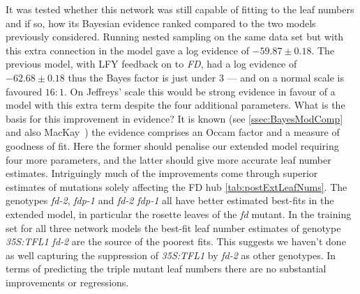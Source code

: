 It was tested whether this network was still capable of fitting to the leaf numbers and if so, how its Bayesian evidence ranked compared to the two models previously considered.
Running nested sampling on the same data set but with this extra connection in the model gave a log evidence of $-59.87\pm 0.18$.
The previous model, with LFY feedback on to \emph{FD}, had a log evidence of $-62.68\pm 0.18$ thus the Bayes factor is just under $3$ --- and on a normal scale is favoured $16:1$.
On Jeffreys' scale this would be strong evidence in favour of a model with this extra term despite the four additional parameters.
What is the basis for this improvement in evidence?
It is known (see \autoref{ssec:BayesModComp} and also MacKay~\cite{mackay2003}) the evidence comprises an Occam factor and a measure of goodness of fit.
Here the former should penalise our extended model requiring four more parameters, and the latter should give more accurate leaf number estimates.
Intriguingly much of the improvements come through superior estimates of mutations solely affecting the FD hub \autoref{tab:postExtLeafNums}.
The genotypes \emph{fd-2}, \emph{fdp-1} and \emph{fd-2 fdp-1} all have better estimated best-fits in the extended model, in particular the rosette leaves of the \emph{fd} mutant.
In the training set for all three network models the best-fit leaf number estimates of genotype \emph{35S:TFL1 fd-2} are the source of the poorest fits.
This suggests we haven't done as well capturing the suppression of \emph{35S:TFL1} by \emph{fd-2} as other genotypes.
In terms of predicting the triple mutant leaf numbers there are no substantial improvements or regressions.

